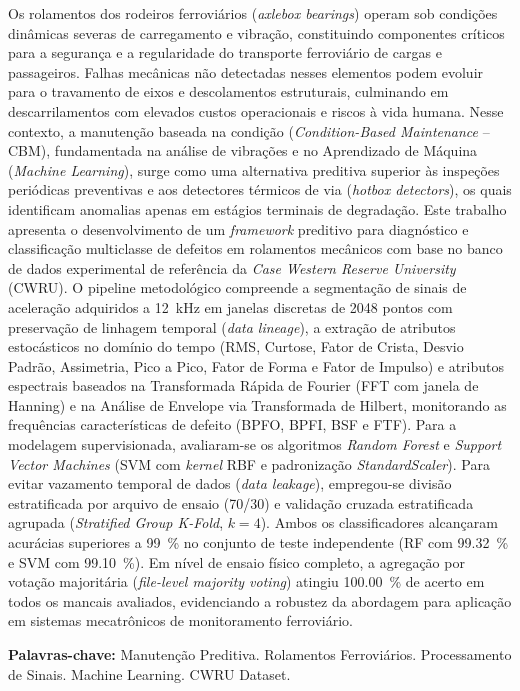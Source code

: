 \begin{resumo}
Os rolamentos dos rodeiros ferroviários (\textit{axlebox bearings}) operam sob condições dinâmicas severas de carregamento e vibração, constituindo componentes críticos para a segurança e a regularidade do transporte ferroviário de cargas e passageiros. Falhas mecânicas não detectadas nesses elementos podem evoluir para o travamento de eixos e descolamentos estruturais, culminando em descarrilamentos com elevados custos operacionais e riscos à vida humana. Nesse contexto, a manutenção baseada na condição (\textit{Condition-Based Maintenance} -- CBM), fundamentada na análise de vibrações e no Aprendizado de Máquina (\textit{Machine Learning}), surge como uma alternativa preditiva superior às inspeções periódicas preventivas e aos detectores térmicos de via (\textit{hotbox detectors}), os quais identificam anomalias apenas em estágios terminais de degradação. Este trabalho apresenta o desenvolvimento de um \textit{framework} preditivo para diagnóstico e classificação multiclasse de defeitos em rolamentos mecânicos com base no banco de dados experimental de referência da \textit{Case Western Reserve University} (CWRU). O pipeline metodológico compreende a segmentação de sinais de aceleração adquiridos a \SI{12}{\kilo\hertz} em janelas discretas de \num{2048} pontos com preservação de linhagem temporal (\textit{data lineage}), a extração de atributos estocásticos no domínio do tempo (RMS, Curtose, Fator de Crista, Desvio Padrão, Assimetria, Pico a Pico, Fator de Forma e Fator de Impulso) e atributos espectrais baseados na Transformada Rápida de Fourier (FFT com janela de Hanning) e na Análise de Envelope via Transformada de Hilbert, monitorando as frequências características de defeito (BPFO, BPFI, BSF e FTF). Para a modelagem supervisionada, avaliaram-se os algoritmos \textit{Random Forest} e \textit{Support Vector Machines} (SVM com \textit{kernel} RBF e padronização \textit{StandardScaler}). Para evitar vazamento temporal de dados (\textit{data leakage}), empregou-se divisão estratificada por arquivo de ensaio (70/30) e validação cruzada estratificada agrupada (\textit{Stratified Group K-Fold}, $k=4$). Ambos os classificadores alcançaram acurácias superiores a \SI{99}{\percent} no conjunto de teste independente (RF com \SI{99,32}{\percent} e SVM com \SI{99,10}{\percent}). Em nível de ensaio físico completo, a agregação por votação majoritária (\textit{file-level majority voting}) atingiu \SI{100,00}{\percent} de acerto em todos os mancais avaliados, evidenciando a robustez da abordagem para aplicação em sistemas mecatrônicos de monitoramento ferroviário.

\vspace{\onelineskip}
\noindent
\textbf{Palavras-chave:} Manutenção Preditiva. Rolamentos Ferroviários. Processamento de Sinais. Machine Learning. CWRU Dataset.
\end{resumo}

